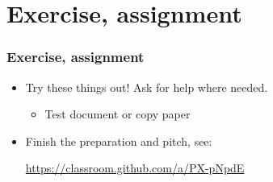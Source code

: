 \documentclass[aspectratio=169]{beamer}
\begin{document}
\section{Exercise, assignment}

\begin{frame}
  \frametitle{Exercise, assignment}

  \begin{itemize}
   \item Try these things out! Ask for help where needed.
   \begin{itemize}
       \item Test document or copy paper
   \end{itemize}
  	   \item Finish the preparation and pitch, see:
    
    \url{https://classroom.github.com/a/PX-pNpdE}
  \end{itemize}
\end{frame}
\end{document}
